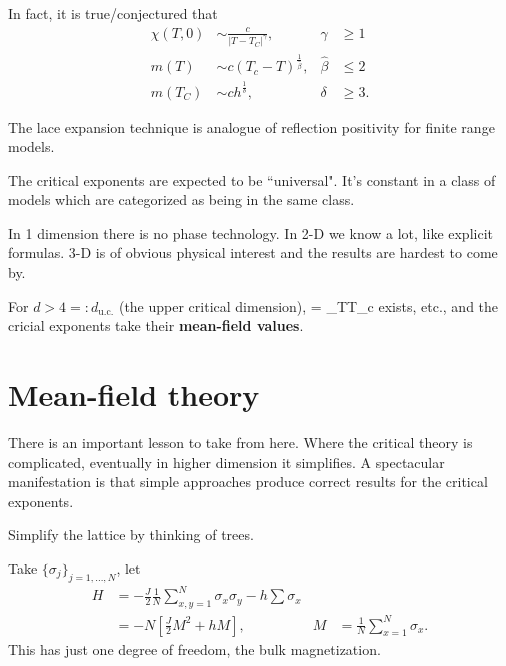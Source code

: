 \documentclass[12pt]{book}
\theoremstyle{norm}
\begin{document}
In fact, it is true/conjectured that %
\begin{align}
\chi(T,0) &\sim \frac{c}{|T-T_C|^{\gamma}}, &\gamma &\ge 1\\
m(T) &\sim c(T_c-T)^{\frac{1}{\widehat{\beta}}},&\widehat{\beta} &\le 2\\
m(T_C)&\sim ch^{\frac{1}{\delta}}, &\delta&\ge 3.
\end{align}

The lace expansion technique is analogue of reflection positivity for finite range models.

The critical exponents are expected to be ``universal".
It's constant in a class of models which are categorized as being in the same class.


In 1 dimension there is no phase technology. In 2-D we know a lot, like explicit formulas. 3-D is of obvious physical interest and the results are hardest to come by.

For $d>4=:d_{\text{u.c.}}$ (the upper critical dimension),
\be
\gamma = \lim_{T\searrow T_c} 
\ee
exists, etc., and the cricial exponents take their \textbf{mean-field values}.

\section{Mean-field theory}
There is an important lesson to take from here. Where the critical theory  is complicated, eventually in higher dimension it simplifies. A spectacular manifestation is that simple approaches produce correct results for the critical exponents.

Simplify the lattice by thinking of trees.

Take $\{\sigma_j\}_{j=1,\ldots, N}$, let 
\begin{align}
H &=-\frac{J}{2} \frac{1}{N} \sum_{x,y=1}^{N} \sigma_x\sigma_y - h\sum\sigma_x\\
& = -N\left[ {\frac{J}{2} M^2 + hM} \right], &M&=\frac{1}{N}\sum_{x=1}^{N} \sigma_x.
\end{align}
This has just one degree of freedom, the bulk magnetization.
\end{document}
